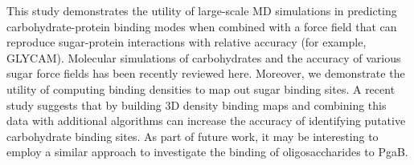 

This study demonstrates the utility of large-scale MD simulations in predicting carbohydrate-protein binding modes when combined with a force field that can reproduce sugar-protein interactions with relative accuracy (for example, GLYCAM). Molecular simulations of carbohydrates and the accuracy of various sugar force fields has been recently reviewed here.\cite{Fadda:2010p5889}  Moreover, we demonstrate the utility of computing binding densities to map out sugar binding sites. A recent study suggests that by building 3D density binding maps and combining this data with additional algorithms can increase the accuracy of identifying putative carbohydrate binding sites.\cite{Tsai:2012bj} As part of future work, it may be interesting to employ a similar approach to investigate the binding of oligosaccharides to PgaB.  




